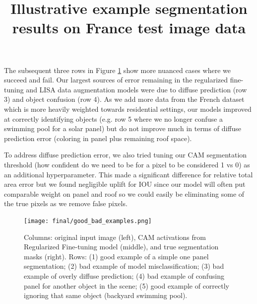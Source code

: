 \documentclass[10pt,twocolumn,letterpaper]{article}
\begin{document}
The subsequent three rows in Figure \ref{fig:examples} show more nuanced cases where we succeed and fail. Our largest sources of error remaining in the regularized fine-tuning and LISA data augmentation models were due to diffuse prediction (row 3) and object confusion (row 4). As we add more data from the French dataset which is more heavily weighted towards residential settings, our models improved at correctly identifying objects (e.g. row 5 where we no longer confuse a swimming pool for a solar panel) but do not improve much in terms of diffuse prediction error (coloring in panel plus remaining roof space). 

To address diffuse prediction error, we also tried tuning our CAM segmentation threshold (how confident do we need to be for a pixel to be considered 1 vs 0) as an additional hyperparameter. This made a significant difference for relative total area error but we found negligible uplift for IOU since our model will often put comparable weight on panel and roof so we could easily be eliminating some of the true pixels as we remove false pixels.

\begin{figure}[htp]
\centering
\title{Illustrative example segmentation results on France test image data}
\texttt{[image: final/good\_bad\_examples.png]}  
\caption{Columns: original input image (left), CAM activations from Regularized Fine-tuning model (middle), and true segmentation masks (right). Rows: (1) good example of a simple one panel segmentation; (2) bad example of model misclassification; (3) bad example of overly diffuse prediction; (4) bad example of confusing panel for another object in the scene; (5) good example of correctly ignoring that same object (backyard swimming pool).}
\label{fig:examples}
\end{figure}

\end{document}
